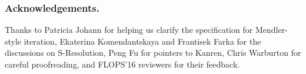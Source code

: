 \documentclass[runningheads,a4paper]{llncs}
\begin{document}
% 
% 
% 
% 

%

\subsubsection*{Acknowledgements.}
Thanks to Patricia Johann for helping us clarify the specification
for Mendler-style iteration, Ekaterina Komendantskaya and
Frantisek Farka for the discussions on S-Resolution,
Peng Fu for pointers to Kanren, Chris Warburton for careful proofreading,
and FLOPS'16 reviewers for their feedback.
\makeatletter
\renewcommand\bibsection{\section*\bibname}
\makeatother



\end{document}
